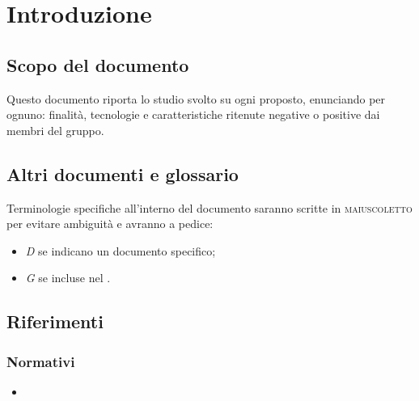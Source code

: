 \documentclass[]{article}
\begin{document}
	

	\newpage


	\tableofcontents
    \newpage

	\section{Introduzione}
		\subsection{Scopo del documento}
		Questo documento riporta lo studio svolto su ogni  proposto,
		enunciando per ognuno: finalità, tecnologie e caratteristiche ritenute
		negative o positive dai membri del gruppo.

		\subsection{Altri documenti e glossario}
		Terminologie specifiche all'interno del documento saranno scritte in \textsc{maiuscoletto} per evitare ambiguità e avranno a pedice:
		\begin{itemize}
			\item \textit{D} se indicano un documento specifico;
			\item \textit{G} se incluse nel .
		\end{itemize}

		\subsection{Riferimenti}
			\subsubsection{Normativi}
			\begin{itemize}
				\item \textbf{}
			\end{itemize}
\end{document}
